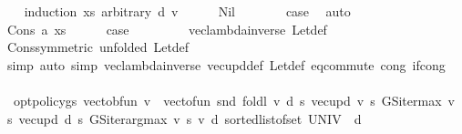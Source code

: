 \begin{isabellebody}
\ \ \isamarkupfalse%
\ {\isacharparenleft}{\kern0pt}induction\ xs\ arbitrary{\isacharcolon}{\kern0pt}\ d\ v{\isacharparenright}{\kern0pt}\isanewline
\ \ \ \ \isamarkupfalse%
\ Nil\isanewline
\ \ \ \ \isamarkupfalse%
\ \isamarkupfalse%
\ {\isacharquery}{\kern0pt}case\ \isamarkupfalse%
\ auto\isanewline
\ \ \isamarkupfalse%
\isanewline
\ \ \ \ \isamarkupfalse%
\ {\isacharparenleft}{\kern0pt}Cons\ a\ xs{\isacharparenright}{\kern0pt}\isanewline
\ \ \ \ \isamarkupfalse%
\ {\isacharquery}{\kern0pt}case\isanewline
\ \ \ \ \ \ \isamarkupfalse%
\ \ vec{\isacharunderscore}{\kern0pt}lambda{\isacharunderscore}{\kern0pt}inverse\ Let{\isacharunderscore}{\kern0pt}def\isanewline
\ \ \ \ \ \ \isamarkupfalse%
\ Cons{\isacharbrackleft}{\kern0pt}symmetric{\isacharcomma}{\kern0pt}\ unfolded\ Let{\isacharunderscore}{\kern0pt}def{\isacharbrackright}{\kern0pt}\isanewline
\ \ \ \ \ \ \isamarkupfalse%
\ simp\ {\isacharparenleft}{\kern0pt}auto\ simp{\isacharcolon}{\kern0pt}\ vec{\isacharunderscore}{\kern0pt}lambda{\isacharunderscore}{\kern0pt}inverse\ vec{\isacharunderscore}{\kern0pt}upd{\isacharunderscore}{\kern0pt}def\ Let{\isacharunderscore}{\kern0pt}def\ eq{\isacharunderscore}{\kern0pt}commute\ cong{\isacharcolon}{\kern0pt}\ if{\isacharunderscore}{\kern0pt}cong{\isacharparenright}{\kern0pt}\isanewline
\ \ \isamarkupfalse%
\isanewline
\ \ \isamarkupfalse%
\ {}{\isacharcolon}{\kern0pt}\ {\isachardoublequoteopen}opt{\isacharunderscore}{\kern0pt}policy{\isacharunderscore}{\kern0pt}gs{\isacharprime}{\kern0pt}{\isacharprime}{\kern0pt}\ {\isacharparenleft}{\kern0pt}vec{\isacharunderscore}{\kern0pt}to{\isacharunderscore}{\kern0pt}bfun\ v{\isacharparenright}{\kern0pt}\ {\isacharequal}{\kern0pt}\ vec{\isacharunderscore}{\kern0pt}to{\isacharunderscore}{\kern0pt}fun\ {\isacharparenleft}{\kern0pt}snd\ {\isacharparenleft}{\kern0pt}foldl\ {\isacharparenleft}{\kern0pt}{\isasymlambda}{\isacharparenleft}{\kern0pt}v{\isacharcomma}{\kern0pt}\ d{\isacharparenright}{\kern0pt}\ s{\isachardot}{\kern0pt}\ {\isacharparenleft}{\kern0pt}vec{\isacharunderscore}{\kern0pt}upd\ v\ s\ {\isacharparenleft}{\kern0pt}GS{\isacharunderscore}{\kern0pt}iter{\isacharunderscore}{\kern0pt}max\ v\ s{\isacharparenright}{\kern0pt}{\isacharcomma}{\kern0pt}\ vec{\isacharunderscore}{\kern0pt}upd\ d\ s\ {\isacharparenleft}{\kern0pt}GS{\isacharunderscore}{\kern0pt}iter{\isacharunderscore}{\kern0pt}arg{\isacharunderscore}{\kern0pt}max\ v\ s{\isacharparenright}{\kern0pt}{\isacharparenright}{\kern0pt}{\isacharparenright}{\kern0pt}\ {\isacharparenleft}{\kern0pt}v{\isacharcomma}{\kern0pt}\ d{\isacharparenright}{\kern0pt}\ {\isacharparenleft}{\kern0pt}sorted{\isacharunderscore}{\kern0pt}list{\isacharunderscore}{\kern0pt}of{\isacharunderscore}{\kern0pt}set\ UNIV{\isacharparenright}{\kern0pt}{\isacharparenright}{\kern0pt}{\isacharparenright}{\kern0pt}{\isachardoublequoteclose}\ \ d\isanewline

\end{isabellebody}
